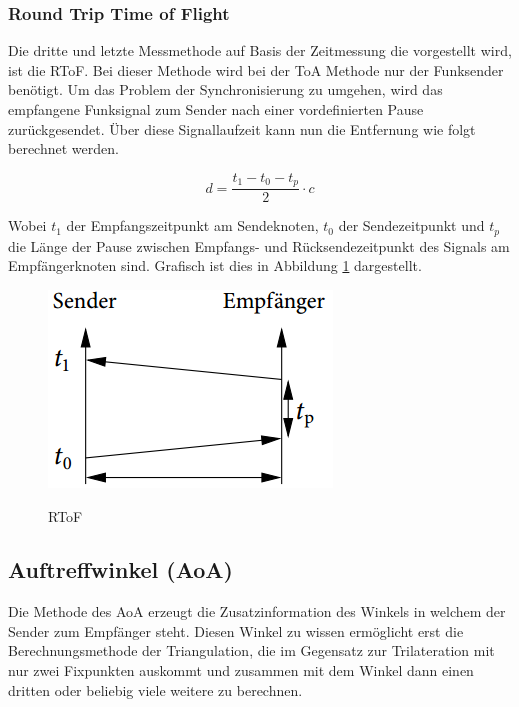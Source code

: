 \subsubsection{Round Trip Time of Flight}
Die dritte und letzte Messmethode auf Basis der Zeitmessung die
vorgestellt wird, ist die \ac{RToF}. Bei dieser Methode wird bei der
ToA Methode nur der Funksender benötigt. Um das Problem der
Synchronisierung zu umgehen, wird das empfangene Funksignal zum Sender
nach einer vordefinierten Pause zurückgesendet. Über diese
Signallaufzeit kann nun die Entfernung wie folgt berechnet werden.

\begin{equation}
  \label{eq:RToF}
    d = \frac{t_{1} - t_{0} - t_{p}}{2} \cdot c
\end{equation}

Wobei $t_{1}$ der Empfangszeitpunkt am Sendeknoten, $t_{0}$ der
Sendezeitpunkt und $t_{p}$ die Länge der Pause zwischen Empfangs- und
Rücksendezeitpunkt des Signals am Empfängerknoten sind.
Grafisch ist dies in Abbildung \ref{fig:RToF} dargestellt.

\begin{figure}[h!]
  \centering
  \includegraphics[scale=0.5]{img/time3}
  \label{fig:RToF}
  \caption{RToF}
\end{figure}

\subsection{Auftreffwinkel (AoA)}
Die Methode des \ac{AoA} erzeugt die Zusatzinformation des Winkels in welchem der Sender zum Empfänger steht. Diesen Winkel zu wissen ermöglicht erst die Berechnungsmethode der Triangulation, die im Gegensatz zur Trilateration mit nur zwei Fixpunkten auskommt und zusammen mit dem Winkel dann einen dritten oder beliebig viele weitere zu berechnen. 
